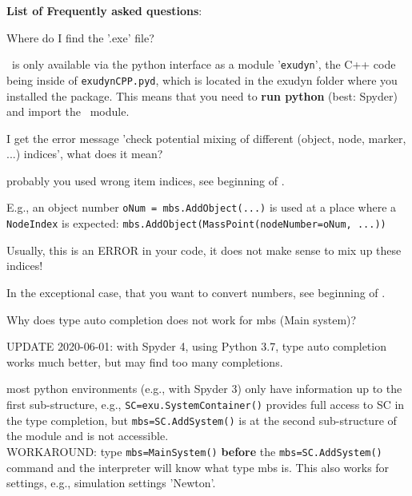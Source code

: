 \en
{\bf List of Frequently asked questions}:
\bn
  \item Where do I find the '.exe' file?
	\bi
	\item[$\ra$] \codeName\ is only available via the python interface as a module '\texttt{exudyn}', the C++ code being inside of \texttt{exudynCPP.pyd}, which is located in the exudyn folder where you installed the package. This means that you need to {\bf run python} (best: Spyder) and import the \codeName\ module.
	\ei
	\item I get the error message 'check potential mixing of different (object, node, marker, ...) indices', what does it mean?
	\bi
	\item[$\ra$] probably you used wrong item indices, see beginning of . 
	\item E.g., an object number \texttt{oNum = mbs.AddObject(...)} is used at a place where a \texttt{NodeIndex} is expected:
	\texttt{mbs.AddObject(MassPoint(nodeNumber=oNum, ...))}
	\item Usually, this is an ERROR in your code, it does not make sense to mix up these indices!
	\item In the exceptional case, that you want to convert numbers, see beginning of .
	\ei
	\item Why does type auto completion does not work for mbs (Main system)?
	\bi
	\item[$\ra$] UPDATE 2020-06-01: with Spyder 4, using Python 3.7, type auto completion works much better, but may find too many completions.
	\item[$\ra$] most python environments (e.g., with Spyder 3) only have information up to the first sub-structure, e.g., \texttt{SC=exu.SystemContainer()} provides full access to SC in the type completion, but \texttt{mbs=SC.AddSystem()} is at the second sub-structure of the module and is not accessible.\\
	WORKAROUND: type \texttt{mbs=MainSystem()} {\bf before} the \texttt{mbs=SC.AddSystem()} command and the interpreter will know what type mbs is. This also works for settings, e.g., simulation settings 'Newton'.
